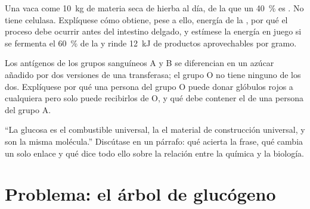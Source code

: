 \begin{exercise}[$\star\star\star$]\label{exo:b1:carbohydrates:10}
Una vaca come \qty{10}{kg} de materia seca de hierba al día, de la que un
\qty{40}{\%} es . No tiene celulasa. Explíquese cómo obtiene, pese a
ello, energía de la , por qué el proceso debe ocurrir antes del
intestino delgado, y estímese la energía en juego si se fermenta el
\qty{60}{\%} de la  y rinde \qty{12}{kJ} de productos aprovechables
por gramo.
\end{exercise}

\begin{exercise}[$\star\star\star$]\label{exo:b1:carbohydrates:11}
Los antígenos de los grupos sanguíneos A y B se diferencian en un azúcar
añadido por dos versiones de una transferasa; el grupo O no tiene ninguno de
los dos. Explíquese por qué una persona del grupo O puede donar glóbulos
rojos a cualquiera pero solo puede recibirlos de O, y qué debe contener el
 de una persona del grupo A.
\end{exercise}

\begin{exercise}[$\star\star\star$]\label{exo:b1:carbohydrates:12}
``La glucosa es el combustible universal, la  el material de
construcción universal, y son la misma molécula.'' Discútase en un párrafo:
qué acierta la frase, qué cambia un solo enlace y qué dice todo ello sobre
la relación entre la química y la biología.
\end{exercise}

\section{Problema: el árbol de glucógeno}


